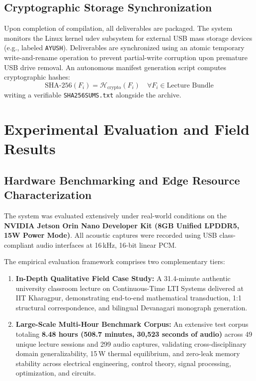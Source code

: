 \documentclass[11pt,a4paper,oneside]{report}
\begin{document}
\section{Cryptographic Storage Synchronization}
Upon completion of compilation, all deliverables are packaged. The system monitors the Linux kernel udev subsystem for external USB mass storage devices (e.g., labeled \texttt{AYUSH}). Deliverables are synchronized using an atomic temporary write-and-rename operation to prevent partial-write corruption upon premature USB drive removal. An autonomous manifest generation script computes cryptographic hashes:
\begin{equation}
  \text{SHA-256}(F_i) = \mathcal{H}_{\text{crypto}}(F_i) \quad \forall F_i \in \text{Lecture Bundle}
\end{equation}
writing a verifiable \texttt{SHA256SUMS.txt} alongside the archive.

\chapter{Experimental Evaluation and Field Results}
\label{chap:results}

\section{Hardware Benchmarking and Edge Resource Characterization}
\label{sec:hardware_eval}
The system was evaluated extensively under real-world conditions on the \textbf{NVIDIA Jetson Orin Nano Developer Kit (8GB Unified LPDDR5, 15W Power Mode)}. All acoustic captures were recorded using USB class-compliant audio interfaces at 16\,kHz, 16-bit linear PCM. 

The empirical evaluation framework comprises two complementary tiers:
\begin{enumerate}
    \item \textbf{In-Depth Qualitative Field Case Study:} A 31.4-minute authentic university classroom lecture on Continuous-Time LTI Systems delivered at IIT Kharagpur, demonstrating end-to-end mathematical transduction, 1:1 structural correspondence, and bilingual Devanagari monograph generation.
    \item \textbf{Large-Scale Multi-Hour Benchmark Corpus:} An extensive test corpus totaling \textbf{8.48 hours (508.7 minutes, 30,523 seconds of audio)} across 49 unique lecture sessions and 299 audio captures, validating cross-disciplinary domain generalizability, 15\,W thermal equilibrium, and zero-leak memory stability across electrical engineering, control theory, signal processing, optimization, and circuits.
\end{enumerate}
\end{document}
